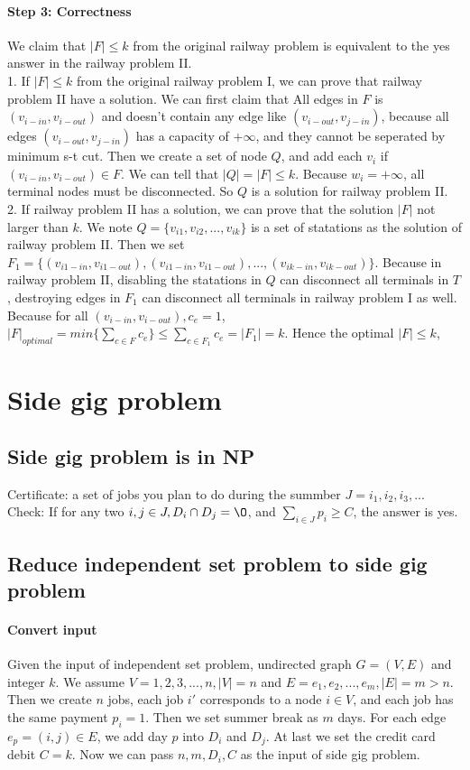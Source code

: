 \documentclass{article}
\begin{document}
	\paragraph{Step 3: Correctness}
	We claim that $|F|\leq k$ from the original railway problem is equivalent to the yes answer in the railway problem II.\\
	1. If $|F|\leq k$ from the original railway problem I, we can prove that railway problem II have a solution. We can first claim that All edges in $F$ is $(v_{i-in},v_{i-out})$ and doesn't contain any edge like $(v_{i-out},v_{j-in})$, because all edges $(v_{i-out},v_{j-in})$ has a capacity of $+\infty$, and they cannot be seperated by minimum s-t cut. Then we create a set of node $Q$, and add each $v_i$ if $(v_{i-in},v_{i-out})\in F$. We can tell that $|Q|=|F|\leq k$. Because $w_i=+\infty$, all terminal nodes must be disconnected. So $Q$ is a solution for railway problem II. \\
	2. If railway problem II has a solution, we can prove that the solution $|F|$ not larger than $k$. We note $Q=\{v_{i1},v_{i2},...,v_{ik}\}$ is a set of statations as the solution of railway problem II. Then we set $F_1=\{(v_{i1-in},v_{i1-out}),(v_{i1-in},v_{i1-out}),...,(v_{ik-in},v_{ik-out})\}$. Because in railway problem II, disabling the statations in $Q$ can disconnect all terminals in $T$, destroying edges in $F_1$ can disconnect all terminals in railway problem I as well. Because for all $(v_{i-in},v_{i-out}), c_e=1$, $|F|_{optimal}=min\{\sum_{c\in F}{c_e}\}\leq \sum_{c\in F_1}{c_e}=|F_1|=k$. Hence the optimal $|F|\leq k$,
	\section{Side gig problem}
	\subsection{Side gig problem is in NP}
	Certificate: a set of jobs you plan to do during the summber $J={i_1,i_2,i_3,...}$\\
	Check: If for any two $i,j\in J, D_i\cap D_j=\O$, and $\sum_{i\in J}{p_i}\geq C$, the answer is yes.
	\subsection{Reduce independent set problem to side gig problem}
	\paragraph{Convert input}
	Given the input of independent set problem, undirected graph $G=(V,E)$ and integer $k$. We assume $V={1,2,3,...,n},|V|=n$ and $E={e_1,e_2,...,e_m}, |E|=m>n$. Then we create $n$ jobs, each job $i'$ corresponds to a node $i\in V$, and each job has the same payment $p_i=1$. Then we set summer break as $m$ days. For each edge $e_p=(i,j)\in E$, we add day $p$ into $D_i$ and $D_j$. At last we set the credit card debit $C=k$. Now we can pass $n,m,{D_i}, C$ as the input of side gig problem.
\end{document}
